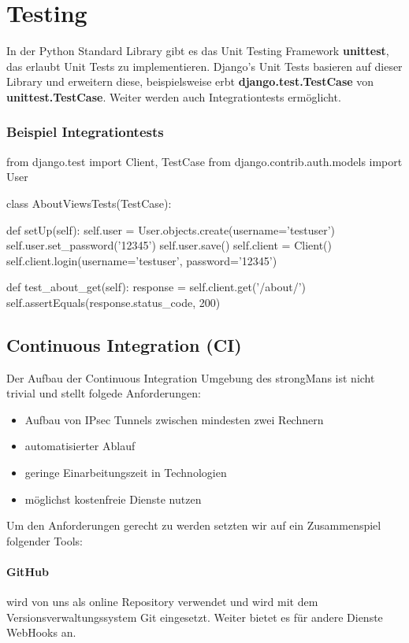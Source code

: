 \section{Testing}
In der Python Standard Library gibt es das Unit Testing Framework \textbf{unittest}, das erlaubt Unit Tests zu implementieren. 
Django's Unit Tests basieren auf dieser Library und erweitern diese, beispielsweise erbt \textbf{django.test.TestCase} von \textbf{unittest.TestCase}. Weiter werden auch Integrationtests ermöglicht.

\subsubsection{Beispiel Integrationtests}
\begin{python}
from django.test import Client, TestCase
from django.contrib.auth.models import User

class AboutViewsTests(TestCase):

   def setUp(self):
       self.user = User.objects.create(username='testuser')
       self.user.set_password('12345')
       self.user.save()
       self.client = Client()
       self.client.login(username='testuser', password='12345')

   def test_about_get(self):
       response = self.client.get('/about/')
       self.assertEquals(response.status_code, 200)      
\end{python}

\subsection{Continuous Integration (CI)}
Der Aufbau der Continuous Integration Umgebung des strongMans ist nicht trivial und stellt folgede Anforderungen:
\begin{itemize}
	\item Aufbau von IPsec Tunnels zwischen mindesten zwei Rechnern
	\item automatisierter Ablauf
	\item geringe Einarbeitungszeit in Technologien
	\item möglichst kostenfreie Dienste nutzen
\end{itemize}
Um den Anforderungen gerecht zu werden setzten wir auf ein Zusammenspiel folgender Tools:
\paragraph{GitHub} wird von uns als online Repository verwendet und wird mit dem Versionsverwaltungssystem Git eingesetzt. Weiter bietet es für andere Dienste WebHooks an. 
